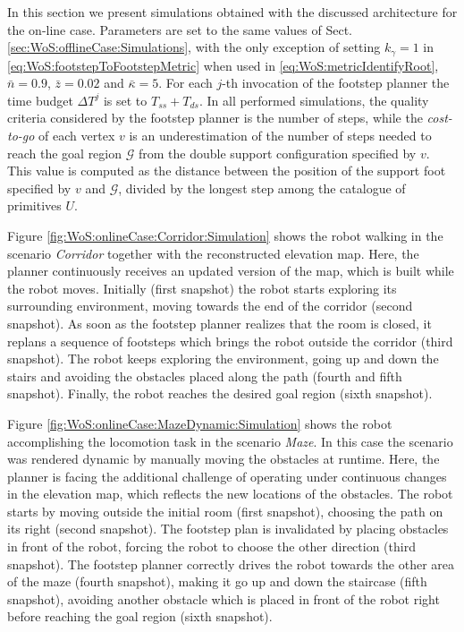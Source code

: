 In this section we present simulations obtained with the discussed architecture
for the on-line case. Parameters are set to the same values of
Sect. \ref{sec:WoS:offlineCase:Simulations}, with the only exception of setting
$k_\gamma = 1$ in \eqref{eq:WoS:footstepToFootstepMetric} when used in
\eqref{eq:WoS:metricIdentifyRoot}, $\bar{n}=0.9$, $\bar{z}=0.02$ and
${\bar{\kappa}}=5$. For each $j$-th invocation of the footstep planner the time
budget $\Delta T^j$ is set to $T_{ss}+T_{ds}$. In all performed simulations,
the quality criteria considered by the footstep planner is the number of steps,
while the \textit{cost-to-go} of each vertex $v$ is an underestimation of the
number of steps needed to reach the goal region $\mathcal{G}$ from the double
support configuration specified by $v$. This value is computed as the distance
between the position of the support foot specified by $v$ and $\mathcal{G}$,
divided by the longest step among the catalogue of primitives $U$. 

Figure \ref{fig:WoS:onlineCase:Corridor:Simulation} shows the robot walking in
the scenario \textit{Corridor} together with the reconstructed elevation map.
Here, the planner continuously receives an updated version of the map, which is
built while the robot moves. Initially (first snapshot) the robot starts
exploring its surrounding environment, moving towards the end of the corridor
(second snapshot). As soon as the footstep planner realizes that the room is
closed, it replans a sequence of footsteps which brings the robot outside the
corridor (third snapshot). The robot keeps exploring the environment, going up
and down the stairs and avoiding the obstacles placed along the path (fourth
and fifth snapshot). Finally, the robot reaches the desired goal region (sixth
snapshot).

Figure \ref{fig:WoS:onlineCase:MazeDynamic:Simulation} shows the robot
accomplishing the locomotion task in the scenario \textit{Maze}. In this
case the scenario was rendered dynamic by manually moving the obstacles at
runtime. Here, the planner is facing the additional challenge of operating under
continuous changes in the elevation map, which reflects the new locations of the
obstacles. The robot starts by moving outside the initial room (first snapshot),
choosing the path on its right (second snapshot). The footstep plan is
invalidated by placing obstacles in front of the robot, forcing the robot to
choose the other direction (third snapshot). The footstep planner correctly
drives the robot towards the other area of the maze (fourth snapshot), making it
go up and down the staircase (fifth snapshot), avoiding another obstacle which
is placed in front of the robot right before reaching the goal region (sixth
snapshot).

